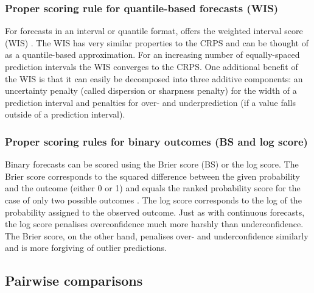 \documentclass[
]{jss}
\begin{document}
\hypertarget{wis}{%
\subsubsection{Proper scoring rule for quantile-based forecasts
(WIS)}\label{wis}}

For forecasts in an interval or quantile format, 
offers the weighted interval score (WIS)
\citep{bracherEvaluatingEpidemicForecasts2021}. The WIS has very similar
properties to the CRPS and can be thought of as a quantile-based
approximation. For an increasing number of equally-spaced prediction
intervals the WIS converges to the CRPS. One additional benefit of the
WIS is that it can easily be decomposed into three additive components:
an uncertainty penalty (called dispersion or sharpness penalty) for the
width of a prediction interval and penalties for over- and
underprediction (if a value falls outside of a prediction interval).

\hypertarget{proper-scoring-rules-for-binary-outcomes-bs-and-log-score}{%
\subsubsection{Proper scoring rules for binary outcomes (BS and log
score)}\label{proper-scoring-rules-for-binary-outcomes-bs-and-log-score}}

Binary forecasts can be scored using the Brier score (BS) or the log
score. The Brier score \citep{brierVERIFICATIONFORECASTSEXPRESSED1950}
corresponds to the squared difference between the given probability and
the outcome (either 0 or 1) and equals the ranked probability score for
the case of only two possible outcomes
\citep{epsteinScoringSystemProbability1969, murphyNoteRankedProbability1971a}.
The log score corresponds to the log of the probability assigned to the
observed outcome. Just as with continuous forecasts, the log score
penalises overconfidence much more harshly than underconfidence. The
Brier score, on the other hand, penalises over- and underconfidence
similarly \citep{macheteContrastingProbabilisticScoring2012} and is more
forgiving of outlier predictions.

\hypertarget{pairwisetheory}{%
\subsection{Pairwise comparisons}\label{pairwisetheory}}
\end{document}
